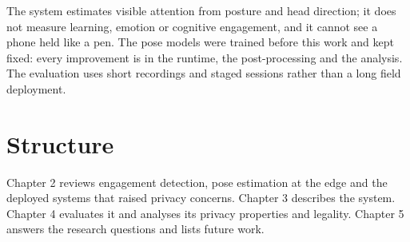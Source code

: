 The system estimates visible attention from posture and head direction; it does not measure learning, emotion or cognitive engagement, and it cannot see a phone held like a pen. The pose models were trained before this work and kept fixed: every improvement is in the runtime, the post-processing and the analysis. The evaluation uses short recordings and staged sessions rather than a long field deployment.

\section{Structure}

Chapter 2 reviews engagement detection, pose estimation at the edge and the deployed systems that raised privacy concerns. Chapter 3 describes the system. Chapter 4 evaluates it and analyses its privacy properties and legality. Chapter 5 answers the research questions and lists future work.
